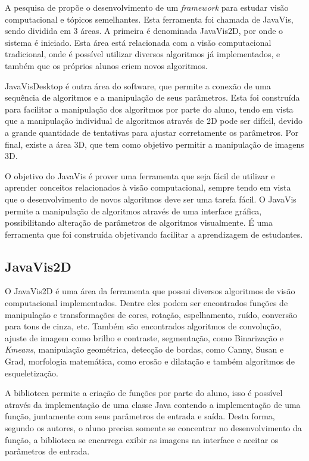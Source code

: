 \documentclass[
	12pt,				%
	oneside,			%
	a4paper,			%
	english,			%
	french,				%
	spanish,			%
	brazil,				%
	]{abntex2}
\begin{document}
A pesquisa de \citet{cazorla2015javavis} propõe o desenvolvimento de um \textit{framework} para estudar visão computacional e tópicos semelhantes. Esta ferramenta foi chamada de JavaVis, sendo  dividida em 3 áreas. A primeira é denominada JavaVis2D, por onde o sistema é iniciado. Esta área está relacionada com a visão computacional tradicional, onde é possível utilizar diversos algoritmos já implementados, e também que os próprios alunos criem novos algoritmos. 

JavaVisDesktop é outra área do software, que permite a conexão de uma sequência de algoritmos e a manipulação de seus parâmetros. Esta foi construída para facilitar a manipulação dos algoritmos por parte do aluno, tendo em vista que a manipulação individual de algoritmos através de 2D pode ser difícil, devido a grande quantidade de tentativas para ajustar corretamente os parâmetros. Por final, existe a área 3D, que tem como objetivo permitir a manipulação de imagens 3D.

O objetivo do JavaVis é prover uma ferramenta que seja fácil de utilizar e aprender conceitos relacionados à visão computacional, sempre tendo em vista que o desenvolvimento de novos algoritmos deve ser uma tarefa fácil. O JavaVis permite a manipulação de algoritmos através de uma interface gráfica, possibilitando alteração de parâmetros de algoritmos visualmente. É uma ferramenta que foi construída objetivando facilitar a aprendizagem de estudantes.

\subsection{JavaVis2D}

O JavaVis2D é uma área da ferramenta que possui diversos algoritmos de visão computacional implementados. Dentre eles podem ser encontrados funções de manipulação e transformações de cores,  rotação, espelhamento, ruído, conversão para tons de cinza, etc. Também são encontrados algoritmos de convolução, ajuste de imagem como brilho e contraste, segmentação, como Binarização e \textit{Kmeans}, manipulação geométrica, detecção de bordas, como Canny, Susan e Grad, morfologia matemática, como erosão e dilatação e também algoritmos de esqueletização. 

A biblioteca permite a criação de funções por parte do aluno, isso é possível através da implementação de uma classe Java contendo a implementação de uma função, juntamente com seus parâmetros de entrada e saída. Desta forma, segundo os autores, o aluno precisa somente se concentrar no desenvolvimento da função, a biblioteca se encarrega exibir as imagens na interface e aceitar os parâmetros de entrada.
\end{document}
